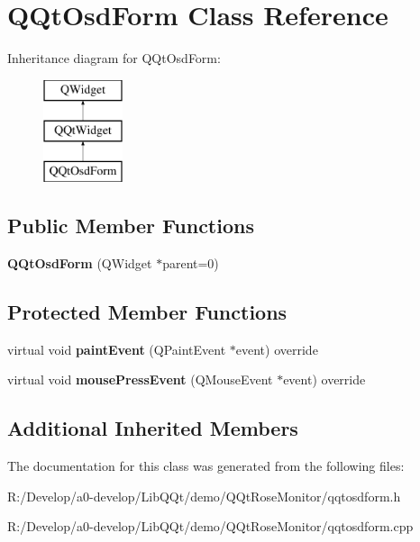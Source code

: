 \hypertarget{class_q_qt_osd_form}{}\section{Q\+Qt\+Osd\+Form Class Reference}
\label{class_q_qt_osd_form}
Inheritance diagram for Q\+Qt\+Osd\+Form\+:\begin{figure}[H]
\begin{center}
\leavevmode
\includegraphics[height=3.000000cm]{class_q_qt_osd_form}
\end{center}
\end{figure}
\subsection*{Public Member Functions}
\begin{DoxyCompactItemize}
\item 
\mbox{\label{class_q_qt_osd_form_a26e1b7c24e0744d2be39fa1222bb200a}} 
{\bfseries Q\+Qt\+Osd\+Form} (Q\+Widget $\ast$parent=0)
\end{DoxyCompactItemize}
\subsection*{Protected Member Functions}
\begin{DoxyCompactItemize}
\item 
\mbox{\label{class_q_qt_osd_form_a21b8960b68c9da1b9c1ff0c34cf473b3}} 
virtual void {\bfseries paint\+Event} (Q\+Paint\+Event $\ast$event) override
\item 
\mbox{\label{class_q_qt_osd_form_a67a78a596a7a169c52add90363a76622}} 
virtual void {\bfseries mouse\+Press\+Event} (Q\+Mouse\+Event $\ast$event) override
\end{DoxyCompactItemize}
\subsection*{Additional Inherited Members}


The documentation for this class was generated from the following files\+:\begin{DoxyCompactItemize}
\item 
R\+:/\+Develop/a0-\/develop/\+Lib\+Q\+Qt/demo/\+Q\+Qt\+Rose\+Monitor/qqtosdform.\+h\item 
R\+:/\+Develop/a0-\/develop/\+Lib\+Q\+Qt/demo/\+Q\+Qt\+Rose\+Monitor/qqtosdform.\+cpp\end{DoxyCompactItemize}
